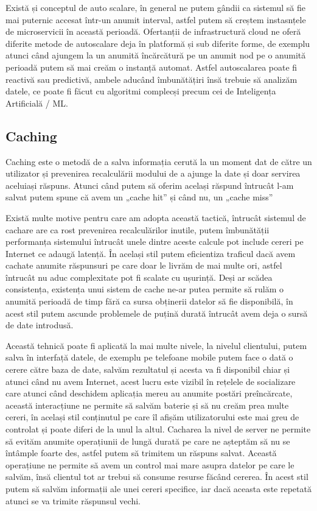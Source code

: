 Există și conceptul de auto scalare, în general ne putem gândii ca sistemul să fie mai puternic
accesat într-un anumit interval, astfel putem să creștem instasnțele de microservicii
în această perioadă. Ofertanții de infrastructură cloud ne oferă diferite metode
de autoscalare deja în platformă și sub diferite forme, de exemplu atunci când ajungem
la un anumită încărcătură pe un anumit nod pe o anumită perioadă putem să mai creăm o
instanță automat. Astfel autoscalarea poate fi reactivă sau predictivă, ambele aducând
îmbunătățiri însă trebuie să analizăm datele, ce poate fi făcut cu algoritmi complecși
precum cei de Inteligența Artificială / ML.

\subsection{Caching}

Caching este o metodă de a salva informația cerută la un moment dat de către un utilizator
și prevenirea recalculării modului de a ajunge la date și doar servirea aceluiași răspuns.
Atunci când putem să oferim același răspund întrucât l-am salvat putem spune că avem
un „cache hit” și când nu, un „cache miss”

Există multe motive pentru care am adopta această tactică, întrucât sistemul de cachare
are ca rost prevenirea recalculărilor inutile, putem îmbunătății performanța sistemului
întrucât unele dintre aceste calcule pot include cereri pe Internet ce adaugă latență.
În același stil putem eficientiza traficul dacă avem cachate anumite răspunsuri
pe care doar le livrăm de mai multe ori, astfel întrucât nu aduc complexitate pot fi
scalate cu ușurință. Deși ar scădea consistența, existența unui sistem de cache ne-ar putea
permite să rulăm o anumită perioadă de timp fără ca sursa obținerii datelor să fie disponibilă,
în acest stil putem ascunde problemele de puțină durată întrucât avem deja o sursă de date
introdusă.

Această tehnică poate fi aplicată la mai multe nivele, la nivelul clientului, putem salva
în interfață datele, de exemplu pe telefoane mobile putem face o dată o cerere către baza
de date, salvăm rezultatul și acesta va fi disponibil chiar și atunci când nu avem Internet,
acest lucru este vizibil în rețelele de socializare care atunci când deschidem aplicația
mereu au anumite postări preîncărcate, această interacțiune ne permite să salvăm baterie
și să nu creăm prea multe cereri, în același stil conținutul pe care îl afișăm utilizatorului
este mai greu de controlat și poate diferi de la unul la altul. Cacharea la nivel de server
ne permite să evităm anumite operațiunii de lungă durată pe care ne așteptăm să nu se întâmple
foarte des, astfel putem să trimitem un răspuns salvat. Această operațiune ne permite să
avem un control mai mare asupra datelor pe care le salvăm, însă clientul tot ar trebui să consume
resurse făcând cererea. În acest stil putem să salvăm informații ale unei cereri specifice,
iar dacă aceasta este repetată atunci se va trimite răspunsul vechi.
